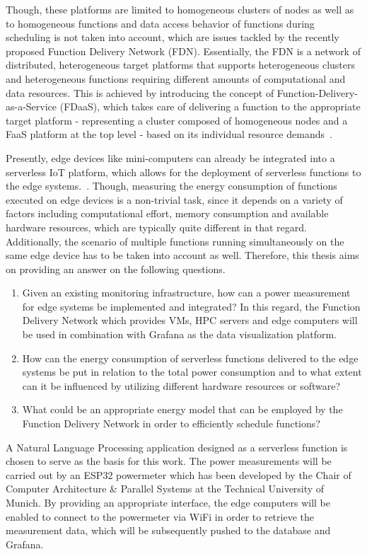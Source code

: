 Though, these platforms are limited to homogeneous clusters of nodes as well as to homogeneous functions and data access behavior of functions during scheduling is not taken into account, which are issues tackled by the recently proposed Function Delivery Network (FDN). Essentially, the FDN is a network of distributed, heterogeneous target platforms that supports heterogeneous clusters and heterogeneous functions requiring different amounts of computational and data resources. This is achieved by introducing the concept of Function-Delivery-as-a-Service (FDaaS), which takes care of delivering a function to the appropriate target platform - representing a cluster composed of homogeneous nodes and a FaaS platform at the top level - based on its individual resource demands~\parencite{fdn}.

Presently, edge devices like mini-computers can already be integrated into a serverless IoT platform, which allows for the deployment of serverless functions to the edge systems.~\parencite{fdn}. Though, measuring the energy consumption of functions executed on edge devices is a non-trivial task, since it depends on a variety of factors including computational effort, memory consumption and available hardware resources, which are typically quite different in that regard. Additionally, the scenario of multiple functions running simultaneously on the same edge device has to be taken into account as well. Therefore, this thesis aims on providing an answer on the following questions.

\begin{enumerate}
  \item Given an existing monitoring infrastructure, how can a power measurement for edge systems be implemented and integrated? In this regard, the Function Delivery Network which provides VMs, HPC servers and edge computers will be used in combination with Grafana as the data visualization platform.
  \item How can the energy consumption of serverless functions delivered to the edge systems be put in relation to the total power consumption and to what extent can it be influenced by utilizing different hardware resources or software?
  \item What could be an appropriate energy model that can be employed by the Function Delivery Network in order to efficiently schedule functions?
\end{enumerate}

A Natural Language Processing application designed as a serverless function is chosen to serve as the basis for this work. The power measurements will be carried out by an ESP32 powermeter which has been developed by the Chair of Computer Architecture \& Parallel Systems at the Technical University of Munich. By providing an appropriate interface, the edge computers will be enabled to connect to the powermeter via WiFi in order to retrieve the measurement data, which will be subsequently pushed to the database and Grafana.

